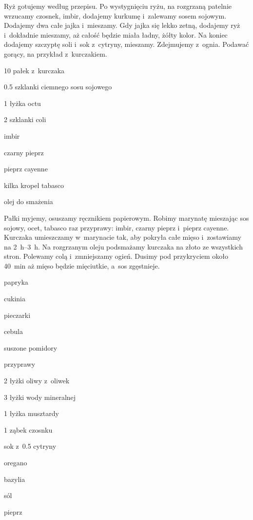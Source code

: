 \documentclass[../main.tex]{subfiles}
\begin{document}
Ryż gotujemy według przepisu. Po wystygnięciu ryżu, na rozgrzaną patelnie
wrzucamy czosnek, imbir, dodajemy kurkumę i~zalewamy sosem sojowym. Dodajemy
dwa całe jajka i~mieszamy. Gdy jajka się lekko zetną, dodajemy ryż i~dokładnie
mieszamy, aż całość będzie miała ładny, żółty kolor. Na koniec dodajemy
szczyptę soli i~sok z~cytryny, mieszamy. Zdejmujemy z~ognia. Podawać gorący, na
przykład z~kurczakiem.


\begin{Ingred}
    \item \num{10} pałek z~kurczaka
    \item \num{0.5} szklanki ciemnego sosu sojowego
    \item \num{1} łyżka octu
    \item \num{2} szklanki coli
    \item imbir
    \item czarny pieprz
    \item pieprz cayenne
    \item kilka kropel tabasco
    \item olej do smażenia
\end{Ingred}

Pałki myjemy, osuszamy ręcznikiem papierowym. Robimy marynatę mieszając sos
sojowy, ocet, tabasco raz przyprawy: imbir, czarny pieprz i~pieprz cayenne.
Kurczaka umieszczamy w~marynacie tak, aby pokryła całe mięso i~zostawiamy na
\qtyrange{2}{3}{\hour}. Na rozgrzanym oleju podsmażamy kurczaka na złoto ze
wszystkich stron. Polewamy colą i~zmniejszamy ogień. Dusimy pod przykryciem
około \qty{40}{\minute} aż mięso będzie mięciutkie, a~sos zgęstnieje.


\begin{Ingred}
    \item papryka
    \item cukinia
    \item pieczarki
    \item cebula
    \item suszone pomidory
    \item przyprawy
\end{Ingred}

\begin{Ingred}[sos]
    \item \num{2} łyżki oliwy z~oliwek
    \item \num{3} łyżki wody mineralnej
    \item \num{1} łyżka musztardy
    \item \num{1} ząbek czosnku
    \item sok z~\num{0.5} cytryny
    \item oregano
    \item bazylia
    \item sól
    \item pieprz
\end{Ingred}
\end{document}
